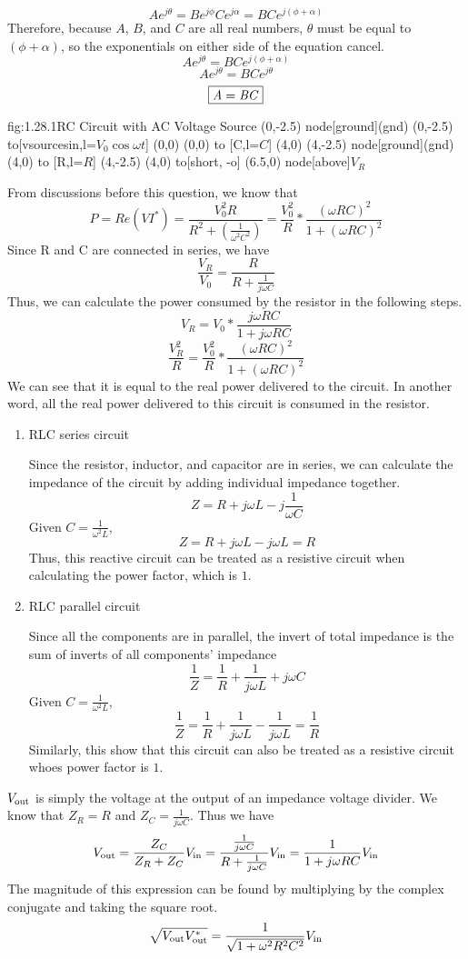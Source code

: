 \[ A e^{j\theta} = B e^{j\phi}C e^{j\alpha} = BC e^{j\left(\phi + \alpha\right)}\]
Therefore, because $A$, $B$, and $C$ are all real numbers, $\theta$ must be equal to $(\phi + \alpha)$, so the exponentials on either side of the equation cancel.
\[A e^{j\theta} =  BC e^{j\left(\phi + \alpha\right)}\]
\[A e^{j\theta} = BC e^{j\theta}\]
\[\boxed{\textnormal{\textit{A}} = \textnormal{\textit{BC}}}\]


\begin{circuit}{fig:1.28.1}{RC Circuit with AC Voltage Source}
    (0,-2.5) node[ground](gnd){}
    (0,-2.5) to[vsourcesin,l=$V_0\cos\omega t$] (0,0)
    (0,0) to [C,l=$C$] (4,0)
    (4,-2.5) node[ground](gnd){}
    (4,0) to [R,l=$R$] (4,-2.5)
    (4,0) to[short, -o] (6.5,0) node[above]{$V_R$}
\end{circuit}
From discussions before this question, we know that 
\[P = Re(VI^*)=\frac{V_0^2R}{R^2+(\frac{1}{\omega^2C^2})}=\frac{V_0^2}{R} * \frac{(\omega RC)^2}{1 + (\omega RC)^2}\]
Since R and C are connected in series, we have
\[\frac{V_R}{V_0} = \frac{R}{R + \frac{1}{j\omega C}}\]
Thus, we can calculate the power consumed by the resistor in the following steps.
\[V_R = V_0 * \frac{j\omega RC}{1+j\omega RC}\]
\[\frac{V_R^2}{R} =\frac{V_0^2}{R} * \frac{(\omega RC)^2}{1 + (\omega RC)^2}\]
We can see that it is equal to the real power delivered to the circuit. In another word, all the real power delivered to this circuit is consumed in the resistor.
\begin{enumerate}
    \item RLC series circuit
    
    Since the resistor, inductor, and capacitor are in series, we can calculate the impedance of the circuit by adding individual impedance together.
    \[Z = R + j\omega L - j \frac{1}{\omega C} \]
    Given $C = \frac{1}{\omega^2 L}$, 
    \[Z = R + j\omega L - j\omega L = R \]
    Thus, this reactive circuit can be treated as a resistive circuit when calculating the power factor, which is $1$.
    \item RLC parallel circuit
    
    Since all the components are in parallel, the invert of total impedance is the sum of inverts of all components' impedance
    \[\frac{1}{Z} = \frac{1}{R} + \frac{1}{j\omega L} + j \omega C\]
    Given $C = \frac{1}{\omega^2 L}$, 
    \[\frac{1}{Z} = \frac{1}{R} + \frac{1}{j\omega L} - \frac{1}{j\omega L} = \frac{1}{R}\]
    Similarly, this show that this circuit can also be treated as a resistive circuit whoes power factor is $1$.
\end{enumerate}
$V_{\text{out}}$ is simply the voltage at the output of an impedance voltage divider. We know that $Z_R = R$ and $Z_C = \frac{1}{j\omega C}$. Thus we have 
\[V_{\text{out}} = \frac{Z_C}{Z_R + Z_C} V_{\text{in}} = \frac{\frac{1}{j \omega C}}{R + \frac{1}{j \omega C}} V_{\text{in}} = \frac{1}{1 + j \omega R C} V_{\text{in}}\]
The magnitude of this expression can be found by multiplying by the complex conjugate and taking the square root.
\[\sqrt{V_{\text{out}} V_{\text{out}}^*} = \frac{1}{\sqrt{1 + \omega^2R^2C^2}}V_{\text{in}}\]

